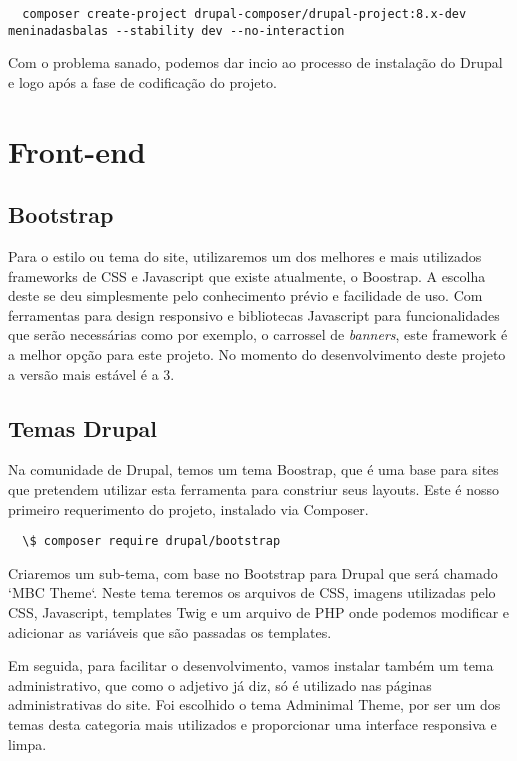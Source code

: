 \begin{lstlisting}
  composer create-project drupal-composer/drupal-project:8.x-dev meninadasbalas --stability dev --no-interaction
\end{lstlisting}

Com o problema sanado, podemos dar incio ao processo de instalação do Drupal e logo após a fase de codificação do projeto.

\section{Front-end}

\subsection{Bootstrap}
Para o estilo ou tema do site, utilizaremos um dos melhores e mais utilizados frameworks de CSS e Javascript que existe atualmente, o Boostrap\cite{Bootstrap}. A escolha deste se deu simplesmente pelo conhecimento prévio e facilidade de uso. Com ferramentas para design responsivo e bibliotecas Javascript para funcionalidades que serão necessárias como por exemplo, o carrossel de \textit{banners}, este framework é a melhor opção para este projeto. No momento do desenvolvimento deste projeto a versão mais estável é a 3.

\subsection{Temas Drupal}
Na comunidade de Drupal, temos um tema Boostrap, que é uma base para sites que pretendem utilizar esta ferramenta para constriur seus layouts. Este é nosso primeiro requerimento do projeto, instalado via Composer.

\begin{lstlisting}
  \$ composer require drupal/bootstrap
\end{lstlisting}

Criaremos um sub-tema, com base no Bootstrap para Drupal que será chamado `MBC Theme`. Neste tema teremos os arquivos de CSS, imagens utilizadas pelo CSS, Javascript, templates Twig e um arquivo de PHP onde podemos modificar e adicionar as variáveis que são passadas os templates. 

Em seguida, para facilitar o desenvolvimento, vamos instalar também um tema administrativo, que como o adjetivo já diz, só é utilizado nas páginas administrativas do site. Foi escolhido o tema Adminimal Theme, por ser um dos temas desta categoria mais utilizados e proporcionar uma interface responsiva e limpa.

